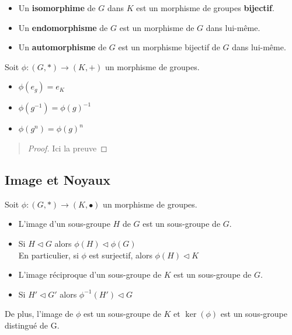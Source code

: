 \begin{definition}
    \begin{itemize}
        \item Un \textbf{isomorphime} de $G$ dans $K$ est un morphisme de groupes \textbf{bijectif}. 
        \item Un \textbf{endomorphisme} de $G$ est un morphisme de $G$ dans lui-même. 
        \item Un \textbf{automorphisme} de $G$ est un morphisme bijectif de $G$ dans lui-même. 
    \end{itemize}
\end{definition}

\begin{prop}
    Soit $\phi : (G,*) \longrightarrow (K,+)$ un morphisme de groupes. 
    \begin{itemize}
        \item $\phi (e_g) = e_{K} $
        \item $\phi(g^{-1}) = \phi(g)^{-1}$
        \item $\phi(g^n) = \phi(g)^n$
    \end{itemize}
\end{prop}


\begin{quote}
	\footnotesize
	\begin{proof}
		Ici la preuve
    \end{proof}
	\normalsize
\end{quote}

\subsection{Image et Noyaux}

\begin{lemma}
    Soit $\phi : (G,*) \longrightarrow (K,\bullet)$ un morphisme de groupes. 
    \begin{itemize}
        \item L'image d'un sous-groupe $H$ de $G$ est un sous-groupe de $G$. 
        \item Si $H \vartriangleleft G$ alors $\phi(H) \vartriangleleft \phi(G)$ \\ 
        En particulier, si $\phi$ est surjectif, alors $\phi(H) \vartriangleleft K$ 
        \item L'image réciproque d'un sous-groupe de $K$ est un sous-groupe de $G$.
        \item Si $H' \vartriangleleft G'$ alors $\phi^{-1}(H') \vartriangleleft G$ 
    \end{itemize}
    De plus, l'image de $\phi$ est un sous-groupe de $K$ et $\ker(\phi)$ est un sous-groupe distingué de G.
\end{lemma}

